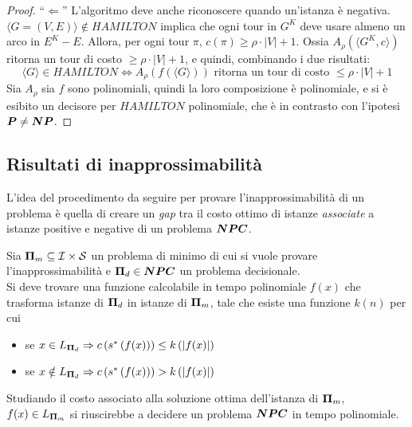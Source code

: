 \begin{proof}
    ``$\Leftarrow$''
    L'algoritmo deve anche riconoscere quando un'istanza è negativa.
    \\
    $ \langle G = (V,E) \rangle \notin HAMILTON$ implica che ogni tour in $G^K$ deve usare almeno un arco in $E^K-E$.
    Allora, per ogni tour $\pi$, $c(\pi) \geq 
    \rho \cdot |V|
    + 1
    $.
    Ossia 
    $A_{\rho} ( \langle G^K ,  c \rangle)$ ritorna un tour di costo $ \geq \rho \cdot |V| + 1 $, e quindi, combinando i due risultati:
    \begin{equation*}
        \langle G \rangle \in HAMILTON
        \Leftrightarrow
        A_{\rho} ( f ( \langle G \rangle) ) \text{ ritorna un tour di costo } \leq \rho \cdot |V| + 1 
    \end{equation*}
    Sia $A_{\rho}$ sia $f$ sono polinomiali, quindi la loro composizione è polinomiale, e si è esibito un decisore per $HAMILTON$ polinomiale, che è in contrasto con l'ipotesi $\bm{P} \ne \bm{NP}$.
\end{proof}

\subsection{Risultati di inapprossimabilità}
L'idea del procedimento da seguire per provare l'inapprossimabilità di un problema è quella di creare un \emph{gap} tra il costo ottimo di istanze \emph{associate} a istanze positive e negative di un problema $\bm{NPC}$.

Sia $\bm{\Pi}_{m} \subseteq \mathcal{I} \times \mathcal{S}$ un problema di minimo di cui si vuole provare l'inapprossimabilità e $\bm{\Pi}_{d} \in \bm{NPC}$ un problema decisionale.
\\
Si deve trovare una funzione calcolabile in tempo polinomiale $f(x)$ che trasforma istanze di 
$\bm{\Pi}_{d}$
in istanze di
$\bm{\Pi}_{m}$,
tale che esiste una funzione $k(n)$ per cui
\begin{itemize}
    \item se $x \in L_{\bm{\Pi}_{d}} \Rightarrow 
        c \left( 
        s^* \left( 
        f (x) \right)\right)
        \leq k \left( 
        | f(x) |
        \right)
        $
    \item se $x \notin L_{\bm{\Pi}_{d}} \Rightarrow 
        c \left( 
        s^* \left( 
        f (x) \right)\right)
        > k \left( 
        | f(x) |
        \right)
        $
\end{itemize}
Studiando il costo associato alla soluzione ottima dell'istanza di 
$\bm{\Pi}_{m}$,
$f(x) \in L_{ \bm{\Pi}_{m} }$
si riuscirebbe a decidere un problema $\bm{NPC}$ in tempo polinomiale.

